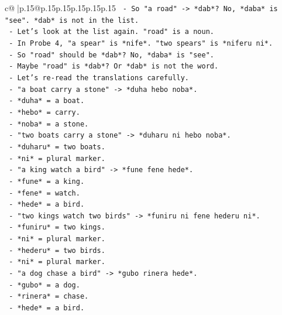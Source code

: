 \documentclass{article}
\begin{document}
{\begin{supertabular}{c@{$\;$}|p{.15\linewidth}@{}p{.15\linewidth}p{.15\linewidth}p{.15\linewidth}p{.15\linewidth}p{.15\linewidth}}
{{{\texttt{            {-} So "a road" {-}> *dab*? No, *daba* is "see". *dab* is not in the list.} \\
\texttt{            {-} Let's look at the list again. "road" is a noun.} \\
\texttt{            {-} In Probe 4, "a spear" is *nife*. "two spears" is *niferu ni*.} \\
\texttt{            {-} So "road" should be *dab*? No, *daba* is "see".} \\
\texttt{            {-} Maybe "road" is *dab*? Or *dab* is not the word.} \\
\texttt{            {-} Let's re{-}read the translations carefully.} \\
\texttt{            {-} "a boat carry a stone" {-}> *duha hebo noba*.} \\
\texttt{              {-} *duha* = a boat.} \\
\texttt{              {-} *hebo* = carry.} \\
\texttt{              {-} *noba* = a stone.} \\
\texttt{            {-} "two boats carry a stone" {-}> *duharu ni hebo noba*.} \\
\texttt{              {-} *duharu* = two boats.} \\
\texttt{              {-} *ni* = plural marker.} \\
\texttt{            {-} "a king watch a bird" {-}> *fune fene hede*.} \\
\texttt{              {-} *fune* = a king.} \\
\texttt{              {-} *fene* = watch.} \\
\texttt{              {-} *hede* = a bird.} \\
\texttt{            {-} "two kings watch two birds" {-}> *funiru ni fene hederu ni*.} \\
\texttt{              {-} *funiru* = two kings.} \\
\texttt{              {-} *ni* = plural marker.} \\
\texttt{              {-} *hederu* = two birds.} \\
\texttt{              {-} *ni* = plural marker.} \\
\texttt{            {-} "a dog chase a bird" {-}> *gubo rinera hede*.} \\
\texttt{              {-} *gubo* = a dog.} \\
\texttt{              {-} *rinera* = chase.} \\
\texttt{              {-} *hede* = a bird.} \\
}}}
\end{supertabular}}
\end{document}
